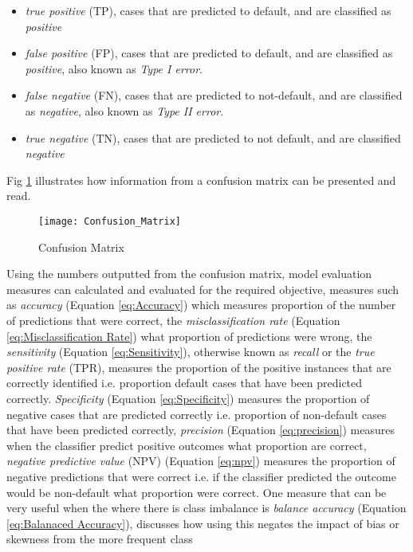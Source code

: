\begin{itemize}
	\item \textit{true positive} (TP), cases that are predicted to default, and are {\color{green}{correctly}} classified as \textit{positive}
	\item \textit{false positive} (FP), cases that are predicted to default, and are {\color{red}{incorrectly}} classified as \textit{positive}, also known as \textit{Type I error}.
	\item \textit{false negative} (FN), cases that are predicted to not-default, and are {\color{red}{incorrectly}} classified as \textit{negative}, also known as \textit{Type II error}.
	\item  \textit{true negative} (TN), cases that are predicted to not default, and are {\color{green}{correctly}} classified \textit{negative}
	
\end{itemize}

Fig \ref{fig:ConfusionMatrix} illustrates how information from a confusion matrix can be presented and read.

\begin{figure}[H]
	\texttt{[image: Confusion\_Matrix]}
	\caption[Confusion Matrix]
	{Confusion Matrix}
	\label{fig:ConfusionMatrix}
\end{figure}

Using the numbers outputted from the confusion matrix, model evaluation measures can calculated and evaluated for the required objective, measures such as \textit{accuracy} (Equation \ref{eq:Accuracy}) which measures proportion of the number of predictions that were correct, the \textit{misclassification rate} (Equation \ref{eq:Misclassification Rate}) what proportion of predictions were wrong, the \textit{sensitivity} (Equation \ref{eq:Sensitivity}), otherwise known as \textit{recall} or the \textit{true positive rate} (TPR), measures the proportion of the positive instances that are correctly identified i.e. proportion default cases that have been predicted correctly. \textit{Specificity} (Equation \ref{eq:Specificity}) measures the proportion of negative cases that are predicted correctly i.e. proportion of non-default cases that have been predicted correctly, \textit{precision} (Equation \ref{eq:precision}) measures when the classifier predict positive outcomes what proportion are correct, \textit{negative predictive value} (NPV) (Equation \ref{eq:npv}) measures the proportion of negative predictions that were correct i.e. if the classifier predicted the outcome would be non-default what proportion were correct. One measure that can be very useful when the where there is class imbalance is \textit{balance accuracy} (Equation \ref{eq:Balanaced Accuracy}), \citep{brodersen_balanced_2010} discusses how using this negates the impact of bias or skewness from the more frequent class

